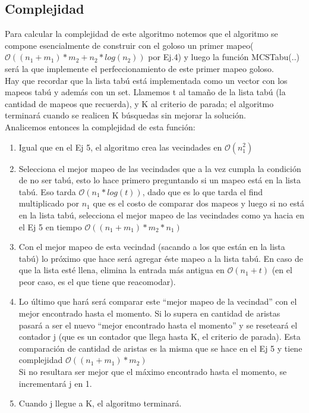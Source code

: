\subsection{Complejidad}
Para calcular la complejidad de este algoritmo notemos que el algoritmo se compone esencialmente de construir con el goloso un primer mapeo($\mathcal{O}((n_1+m_1)*m_2+n_2*log(n_2))$ por Ej.4) y luego la función MCSTabu(..) será la que implemente el perfeccionamiento de este primer mapeo goloso.\\
Hay que recordar que la lista tabú está implementada como un vector con los mapeos tabú y además con un set. Llamemos t al tamaño de la lista tabú (la cantidad de mapeos que recuerda), y K al criterio de parada; el algoritmo terminará cuando se realicen K búsquedas sin mejorar la solución.\\
Analicemos entonces la complejidad de esta función:\\
\begin{enumerate}
\item Igual que en el Ej 5, el algoritmo crea las vecindades en $\mathcal{O}(n_1^2)$
\item Selecciona el mejor mapeo de las vecindades que a la vez cumpla la condición de no ser tabú, esto lo hace primero preguntando si un mapeo está en la lista tabú. Eso tarda $\mathcal{O}(n_1*log(t))$, dado que es lo que tarda el find multiplicado por $n_1$ que es el costo de comparar dos mapeos y luego si no está en la lista tabú, selecciona el mejor mapeo de las vecindades como ya hacia en el Ej 5 en tiempo $\mathcal{O}((n_1+m_1)*m_2*n_1)$
\item Con el mejor mapeo de esta vecindad (sacando a los que están en la lista tabú) lo próximo que hace será agregar éste mapeo a la lista tabú. En caso de que la lista esté llena, elimina la entrada más antigua en $\mathcal{O}(n_1+t)$ (en el peor caso, es el que tiene que reacomodar).
\item Lo último que hará será comparar este ``mejor mapeo de la vecindad'' con el mejor encontrado hasta el momento. Si lo supera en cantidad de aristas pasará a ser el nuevo ``mejor encontrado hasta el momento'' y se reseteará el contador j (que es un contador que llega hasta K, el criterio de parada). Esta comparación de cantidad de aristas es la misma que se hace en el Ej 5 y tiene complejidad $\mathcal{O}((n_1+m_1)*m_2)$\\
Si no resultara ser mejor que el máximo encontrado hasta el momento, se incrementará j en 1.
\item Cuando j llegue a K, el algoritmo terminará.
\end{enumerate}
